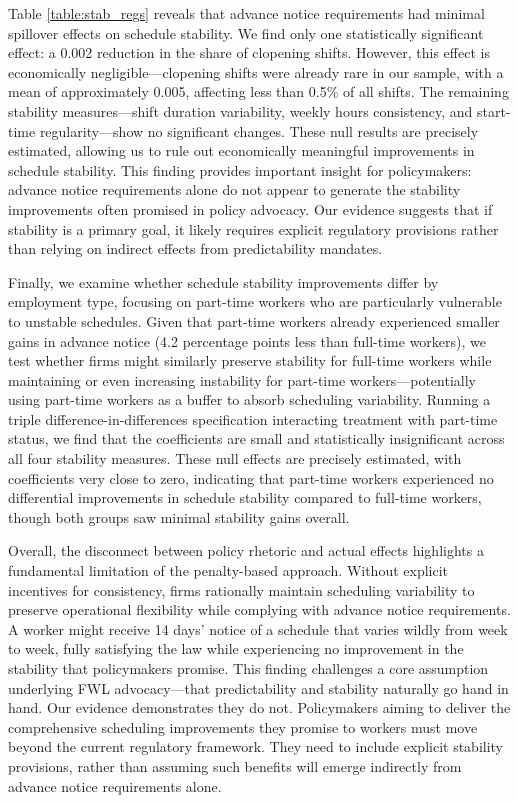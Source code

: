\documentclass[letterpaper,11pt,leqno]{article}
\theoremstyle{paper}
\begin{document}
Table \ref{table:stab_regs} reveals that advance notice requirements had minimal spillover effects on schedule stability. We find only one statistically significant effect: a 0.002 reduction in the share of clopening shifts. However, this effect is economically negligible—clopening shifts were already rare in our sample, with a mean of approximately 0.005, affecting less than 0.5\% of all shifts. The remaining stability measures—shift duration variability, weekly hours consistency, and start-time regularity—show no significant changes. These null results are precisely estimated, allowing us to rule out economically meaningful improvements in schedule stability. This finding provides important insight for policymakers: advance notice requirements alone do not appear to generate the stability improvements often promised in policy advocacy. Our evidence suggests that if stability is a primary goal, it likely requires explicit regulatory provisions rather than relying on indirect effects from predictability mandates.

Finally, we examine whether schedule stability improvements differ by employment type, focusing on part-time workers who are particularly vulnerable to unstable schedules. Given that part-time workers already experienced smaller gains in advance notice (4.2 percentage points less than full-time workers), we test whether firms might similarly preserve stability for full-time workers while maintaining or even increasing instability for part-time workers—potentially using part-time workers as a buffer to absorb scheduling variability. Running a triple difference-in-differences specification interacting treatment with part-time status, we find that the coefficients are small and statistically insignificant across all four stability measures. These null effects are precisely estimated, with coefficients very close to zero, indicating that part-time workers experienced no differential improvements in schedule stability compared to full-time workers, though both groups saw minimal stability gains overall.


Overall, the disconnect between policy rhetoric and actual effects highlights a fundamental limitation of the penalty-based approach. Without explicit incentives for consistency, firms rationally maintain scheduling variability to preserve operational flexibility while complying with advance notice requirements. A worker might receive 14 days' notice of a schedule that varies wildly from week to week, fully satisfying the law while experiencing no improvement in the stability that policymakers promise. This finding challenges a core assumption underlying FWL advocacy—that predictability and stability naturally go hand in hand. Our evidence demonstrates they do not. Policymakers aiming to deliver the comprehensive scheduling improvements they promise to workers must move beyond the current regulatory framework. They need to include explicit stability provisions, rather than assuming such benefits will emerge indirectly from advance notice requirements alone.
\end{document}
